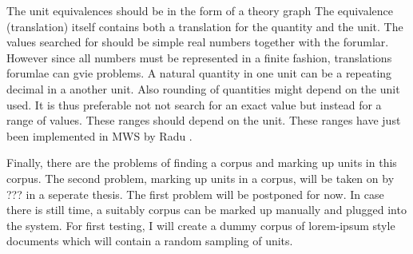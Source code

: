 \documentclass[11pt]{article}
\begin{document}
The unit equivalences should be in the form of a theory graph  The equivalence
(translation) itself contains both a translation for the quantity and the unit. The values searched for should be simple real numbers together with the forumlar. However since all numbers must be represented in a finite fashion, translations forumlae can gvie problems. A natural quantity in one unit can be a repeating decimal in a another unit. Also rounding of quantities might depend on the unit used. It is thus preferable not not search for an exact value but instead for a range of values. These ranges should depend on the unit. These ranges have just been implemented in MWS by Radu .  

Finally, there are the problems of finding a corpus and marking up units in this corpus. The second problem, marking up units in a corpus, will be taken on by ??? in a seperate thesis. The first problem will be postponed for now. In case there is still time, a suitably corpus can be marked up manually and plugged into the system. For first testing, I will create a dummy corpus of lorem-ipsum style documents which will contain a random sampling of units.


{}

\end{document}
